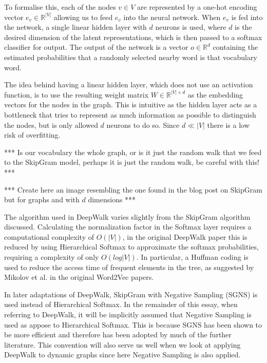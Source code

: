 \documentclass[a4paper]{article}
\begin{document}
To formalise this, each of the nodes $v \in V$ are represented by a one-hot
encoding vector $e_v \in \mathbb{R}^{|V|}$ allowing us to feed $e_v$ into the
neural network. When $e_v$ is fed into the network, a single linear hidden layer with
$d$ neurons is used, where $d$ is the desired dimension of the latent
representations, which is then passed to a softmax classifier for output. The
output of the network is a vector $o \in \mathbb{R}^d$ containing the estimated
probabilities that a randomly selected nearby word is that vocabulary word.

The idea behind having a linear hidden layer, which does not use an activation
function, is to use the resulting weight matrix $W \in \mathbb{R}^{|V| \times
  d}$ as the embedding vectors for the nodes in the graph. This is intuitive as
the hidden layer acts as a bottleneck that tries to represent as much
information as possible to distinguish the nodes, but is only allowed $d$
neurons to do so. Since $d \ll |V|$ there is a low risk of overfitting.

*** Is our vocabulary the whole graph, or is it just the random walk that we
feed to the SkipGram model, perhaps it is just the random walk, be careful with
this! ***

*** Create here an image resembling the one found in the blog post on SkipGram
but for graphs and with $d$ dimensions ***

The algorithm used in DeepWalk varies slightly from the SkipGram algorithm
discussed. Calculating the normalization factor in the Softmax layer requires a
computational complexity of $O(|V|)$, in the original DeepWalk paper this is
reduced by using Hierarchical Softmax to approximate the softmax probabilities,
requiring a complexity of only $O(log|V|)$. In particular, a Huffman coding is
used to reduce the access time of frequent elements in the tree, as suggested by
Mikolov et al. in the original Word2Vec
papers.\cite{mikolov2013distributed,mikolov2013efficient}

In later adaptations of DeepWalk, SkipGram with Negative Sampling (SGNS) is used instead of
Hierarchical Softmax. In the remainder of this essay, when referring to DeepWalk, it will be
implicitly assumed that Negative Sampling is used as appose to Hierarchical
Softmax. This is because SGNS has been shown to be more efficient
and therefore has been adopted by much of the further literature. This convention will also
serve us well when we look at applying DeepWalk to dynamic graphs since here
Negative Sampling is also applied.\\
\end{document}
